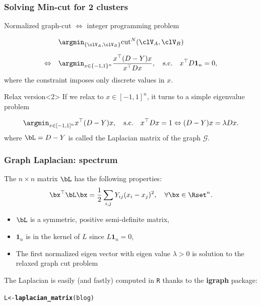 \documentclass{beamer}\usepackage[]{graphicx}\usepackage[]{color}
\makeatletter
\newcommand{\hlstd}[1]{\textcolor[rgb]{0.345,0.345,0.345}{#1}}%
\newcommand{\hlkwb}[1]{\textcolor[rgb]{0.69,0.353,0.396}{#1}}%
\newcommand{\hlkwd}[1]{\textcolor[rgb]{0.737,0.353,0.396}{\textbf{#1}}}%
\newenvironment{kframe}{%
 \def\at@end@of@kframe{}%
 \ifinner\ifhmode%
  \def\at@end@of@kframe{\end{minipage}}%
  \begin{minipage}{\columnwidth}%
 \fi\fi%
 \def\FrameCommand##1{\hskip\@totalleftmargin \hskip-\fboxsep
 \colorbox{shadecolor}{##1}\hskip-\fboxsep
     \hskip-\linewidth \hskip-\@totalleftmargin \hskip\columnwidth}%
 \MakeFramed {\advance\hsize-\width
   \@totalleftmargin\z@ \linewidth\hsize
   \@setminipage}}%
 {\par\unskip\endMakeFramed%
 \at@end@of@kframe}
\newenvironment{knitrout}{}{} %
\makeatother
\begin{document}
\begin{frame}
  \frametitle{Solving Min-cut for 2 clusters}

\begin{block}{Normalized graph-cut $\Leftrightarrow$ integer programming problem}

$$\begin{aligned}
& \argmin_{\{\clV_A, \clV_B\}}  \mathrm{cut}^{N}(\clV_A, \clV_B) \\[1.5ex]
\Leftrightarrow \quad & \argmin_{x\in\{-1, 1\}^n} \frac{x^\top (D - Y) x}{x^\top D x}, \quad \text{s.c.} \quad x^\top D \mathbf{1}_n = 0, 
\end{aligned}
$$
where the constraint imposes only discrete values in $x$. 

\end{block}

\begin{block}{Relax version}<2>
If we relax to $x\in[-1,1]^n$, it turns to a simple eigenvalue problem

$$
\argmin_{x\in[-1, 1]^n} x^\top (D - Y) x, \quad \text{s.c.} \quad x^\top D x = 1 \Leftrightarrow (D - Y) x = \lambda D x .
$$
where $\bL = D - Y$ is called the \alert{Laplacian matrix} of the graph $\mathcal{G}$.

\end{block}
  
\end{frame}

\begin{frame}[fragile]
  \frametitle{Graph Laplacian: spectrum}

  \begin{proposition}[Spectrum of $\bL$]
    The $n\times n$ matrix $\bL$ has the following properties:
    \[
      \bx^\top \bL \bx = \frac{1}{2} \sum_{i,j} Y_{ij} (x_i - x_j)^2, \quad \forall \bx\in\Rset^n .
    \]
    \vspace{-.25cm}
    \begin{itemize}
      \item $\bL$ is a symmetric, positive semi-definite matrix,
      \item $\mathbf{1}_n$ is in the kernel of $L$ since $L \mathbf{1}_n = 0$,
      \item The first normalized eigen vector with eigen value $\lambda> 0$ is solution to the relaxed graph cut problem
    \end{itemize}  
  \end{proposition}

The Laplacian is easily (and fastly) computed in \texttt{R} thanks to the \textbf{igraph} package:

\begin{knitrout}\scriptsize
{}\color{fgcolor}\begin{kframe}
\begin{alltt}
\hlstd{L} \hlkwb{<-} \hlkwd{laplacian_matrix}\hlstd{(blog)}
\end{alltt}
\end{kframe}
\end{knitrout}

\end{frame}
\end{document}
